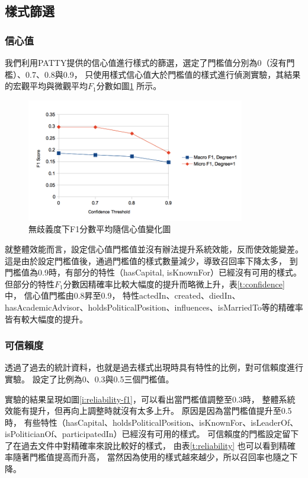 

\subsection{樣式篩選}
\subsubsection{信心值}
我們利用PATTY提供的信心值進行樣式的篩選，選定了門檻值分別為0（沒有門檻）、0.7、0.8與0.9，
只使用樣式信心值大於門檻值的樣式進行偵測實驗，其結果的宏觀平均與微觀平均$F_1$分數如圖\ref{i:conf-f1} 所示。

\begin{figure}[h]
    \centering
    \includegraphics[width=0.85\textwidth]{images/04-conf-f1}
    \caption{無歧義度下F1分數平均隨信心值變化圖}
    \label{i:conf-f1}
\end{figure}

就整體效能而言，設定信心值門檻值並沒有辦法提升系統效能，反而使效能變差。
這是由於設定門檻值後，通過門檻值的樣式數量減少，導致召回率下降太多，
到門檻值為0.9時，有部分的特性（hasCapital, isKnownFor）已經沒有可用的樣式。
但部分的特性$F_1$分數因精確率比較大幅度的提升而略微上升，表\ref{t:confidence} 中，
信心值門檻由0.8昇至0.9，
特性actedIn、created、diedIn、hasAcademicAdvisor、holdsPoliticalPosition、influences、isMarriedTo等的精確率皆有較大幅度的提升。



\subsubsection{可信賴度}
透過了過去的統計資料，也就是過去樣式出現時具有特性的比例，對可信賴度進行實驗。
設定了比例為0、0.3與0.5三個門檻值。

實驗的結果呈現如圖\ref{i:reliability-f1}，可以看出當門檻值調整至0.3時，
整體系統效能有提升，但再向上調整時就沒有太多上升。
原因是因為當門檻值提升至0.5時，
有些特性（hasCapital、holdsPoliticalPosition、isKnownFor、isLeaderOf、isPoliticianOf、participatedIn）已經沒有可用的樣式。
可信賴度的門檻設定留下了在過去文件中對精確率來說比較好的樣式，
由表\ref{t:reliability} 也可以看到精確率隨著門檻值提高而升高，
當然因為使用的樣式越來越少，所以召回率也隨之下降。

